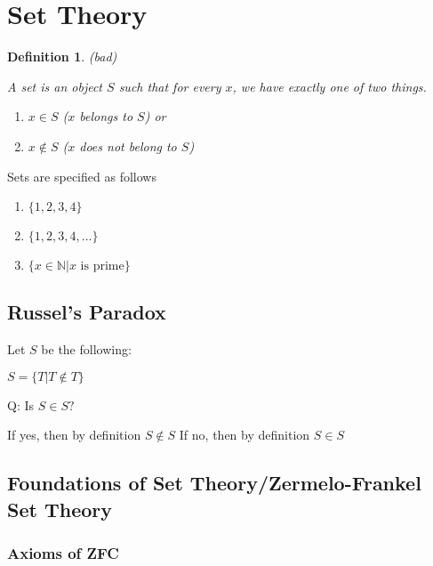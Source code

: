 \documentclass[twoside]{article}
\newcommand{\N}{\mathbb{N}}
\newtheorem{definition}[theorem]{Definition}
\begin{document}
\section {Set Theory}

\begin{definition}{(bad)}

    A set is an object $S$ such that for every $x$, we have exactly one of two things.

    \begin{enumerate}
        \item $x \in S$ ($x$ belongs to $S$) or
        \item $x \not\in S$ ($x$ does not belong to $S$)
    \end{enumerate}
\end{definition}

Sets are specified as follows
\begin{enumerate}
    \item $\{1,2,3,4\}$
    \item $\{1,2,3,4,...\}$
    \item $\{x \in \N \vert x \text{ is prime}\}$
\end{enumerate}

\subsection{Russel's Paradox}
Let $S$ be the following:

$S = \{T \vert T \not\in T\}$

Q: Is $S \in S?$

If yes, then by definition $S \not\in S$
If no, then by definition $S \in S$

\subsection{Foundations of Set Theory/Zermelo-Frankel Set Theory}
\subsubsection{Axioms of ZFC}
\end{document}
